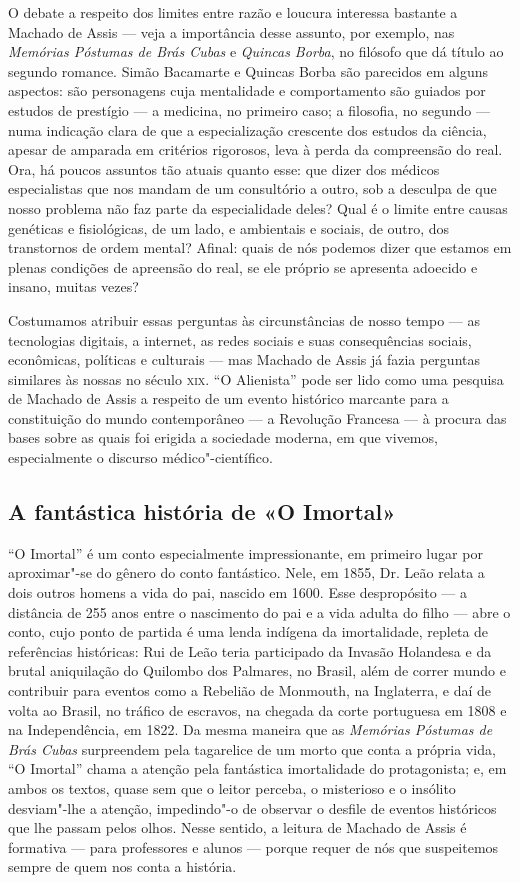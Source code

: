 O debate a respeito dos limites entre razão e loucura interessa bastante
a Machado de Assis --- veja a importância desse assunto, por exemplo, nas
\emph{Memórias Póstumas de Brás Cubas} e \emph{Quincas Borba}, no
filósofo que dá título ao segundo romance. Simão Bacamarte e Quincas
Borba são parecidos em alguns aspectos: são personagens cuja mentalidade
e comportamento são guiados por estudos de prestígio --- a medicina, no
primeiro caso; a filosofia, no segundo --- numa indicação clara de que a
especialização crescente dos estudos da ciência, apesar de amparada em
critérios rigorosos, leva à perda da compreensão do real. Ora, há poucos
assuntos tão atuais quanto esse: que dizer dos médicos especialistas que
nos mandam de um consultório a outro, sob a desculpa de que nosso
problema não faz parte da especialidade deles? Qual é o limite entre
causas genéticas e fisiológicas, de um lado, e ambientais e sociais, de
outro, dos transtornos de ordem mental? Afinal: quais de nós podemos
dizer que estamos em plenas condições de apreensão do real, se ele
próprio se apresenta adoecido e insano, muitas vezes?

Costumamos atribuir essas perguntas às circunstâncias de nosso tempo ---
as tecnologias digitais, a internet, as redes sociais e suas
consequências sociais, econômicas, políticas e culturais --- mas Machado
de Assis já fazia perguntas similares às nossas no século \textsc{xix}. ``O
Alienista'' pode ser lido como uma pesquisa de Machado de Assis a
respeito de um evento histórico marcante para a constituição do mundo
contemporâneo --- a Revolução Francesa --- à procura das bases sobre as
quais foi erigida a sociedade moderna, em que vivemos, especialmente o
discurso médico"-científico.

\subsection{A fantástica história de «O Imortal»}

``O Imortal'' é um conto especialmente impressionante, em primeiro lugar
por aproximar"-se do gênero do conto fantástico. Nele, em 1855, Dr. Leão
relata a dois outros homens a vida do pai, nascido em 1600. Esse
despropósito --- a distância de 255 anos entre o nascimento do pai e a
vida adulta do filho --- abre o conto, cujo ponto de partida é uma lenda
indígena da imortalidade, repleta de referências históricas: Rui de Leão
teria participado da Invasão Holandesa e da brutal aniquilação do
Quilombo dos Palmares, no Brasil, além de correr mundo e contribuir para
eventos como a Rebelião de Monmouth, na Inglaterra, e daí de volta ao
Brasil, no tráfico de escravos, na chegada da corte portuguesa em 1808 e
na Independência, em 1822. Da mesma maneira que as \emph{Memórias
Póstumas de Brás Cubas} surpreendem pela tagarelice de um morto que
conta a própria vida, ``O Imortal'' chama a atenção pela fantástica
imortalidade do protagonista; e, em ambos os textos, quase sem que o
leitor perceba, o misterioso e o insólito desviam"-lhe a atenção,
impedindo"-o de observar o desfile de eventos históricos que lhe passam
pelos olhos. Nesse sentido, a leitura de Machado de Assis é formativa ---
para professores e alunos --- porque requer de nós que suspeitemos sempre
de quem nos conta a história.

